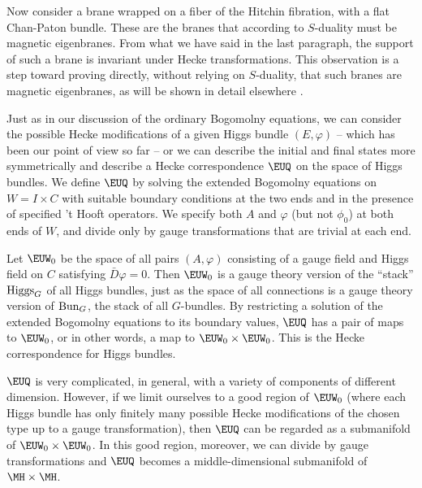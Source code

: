 Now consider a brane wrapped on a fiber of the Hitchin fibration,
with a flat Chan-Paton bundle. These are the branes that according
to $S$-duality must be magnetic eigenbranes. From what we have
said in the last paragraph, the support of such a brane is
invariant under Hecke transformations.  This observation is a step
toward proving directly, without relying on $S$-duality, that such
branes are magnetic eigenbranes, as will be shown in detail
elsewhere \cite{ref26}.

\par{}

Just as in our discussion of the ordinary Bogomolny equations, we
can consider the possible Hecke modifications of a given Higgs
bundle $(E,\varphi)$ -- which has been our point of view so far --
or we can describe the initial and final states more symmetrically
and describe a Hecke correspondence ${\EUQ}$ on the space of Higgs
bundles. We define ${\EUQ}$ by solving the extended Bogomolny
equations on $W=I\times C$ with suitable boundary conditions at
the two ends and in the presence of specified 't Hooft operators.
We specify both $A$ and $\varphi$ (but not $\phi_0$) at both ends
of $W$, and divide only by gauge transformations that are trivial
at each end.

Let $\EUW_0$ be the space of all pairs $(A,\varphi)$ consisting of
a gauge field and Higgs field on $C$ satisfying $\bar D\varphi=0$.
Then $\EUW_0$ is a gauge theory version of the ``stack'' ${\rm
Higgs}_G$ of all Higgs bundles, just as the space of all
connections is a gauge theory version of ${\rm Bun}_G$, the stack
of all $G$-bundles.  By restricting a solution of the extended
Bogomolny equations to its boundary values, ${\EUQ}$ has a pair of
maps to $\EUW_0$, or in other words, a map to $\EUW_0\times
\EUW_0$. This is the Hecke correspondence for Higgs bundles.

${\EUQ}$ is very complicated, in general, with a variety of
components of different dimension.  However, if we limit ourselves
to a good region of $\EUW_0$ (where each Higgs bundle has only
finitely many possible Hecke modifications of the chosen type up
to a gauge transformation), then ${\EUQ}$ can be regarded as a
submanifold of $\EUW_0\times \EUW_0$. In this good region,
moreover, we can divide by gauge transformations and  ${\EUQ}$
becomes a middle-dimensional submanifold of $\MH\times\MH$.

